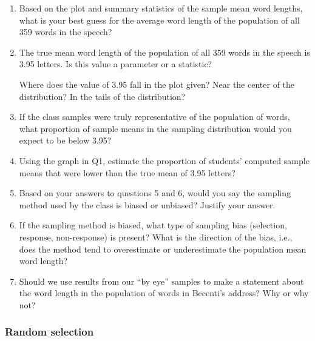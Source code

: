 \documentclass[
]{report}
\begin{document}
\begin{enumerate}
\def\labelenumi{\arabic{enumi}.}
\setcounter{enumi}{2}
\item
  Based on the plot and summary statistics of the sample mean word lengths, what is your best guess for the average word length of the population of all 359 words in the speech?
  \vspace{0.3in}
\item
  The true mean word length of the population of all 359 words in the speech is 3.95 letters. Is this value a parameter or a statistic?\\
  \vspace{0.2in}

  Where does the value of 3.95 fall in the plot given? Near the center of the distribution? In the tails of the distribution?
  \vspace{0.3in}
\item
  If the class samples were truly representative of the population of words, what proportion of sample means in the sampling distribution would you expect to be below 3.95?
  \vspace{0.5in}
\item
  Using the graph in Q1, estimate the proportion of students' computed sample means that were lower than the true mean of 3.95 letters?
  \vspace{0.5in}
\item
  Based on your answers to questions 5 and 6, would you say the sampling method used by the class is biased or unbiased? Justify your answer.\\
  \vspace{0.5in}
\item
  If the sampling method is biased, what type of sampling bias (selection, response, non-response) is present? What is the direction of the bias, i.e., does the method tend to overestimate or underestimate the population mean word length?
  \vspace{0.5in}
\item
  Should we use results from our ``by eye'' samples to make a statement about the word length in the population of words in Becenti's address? Why or why not?
  \vspace{0.6in}
\end{enumerate}

\subsubsection*{Random selection}\label{random-selection}
\end{document}
